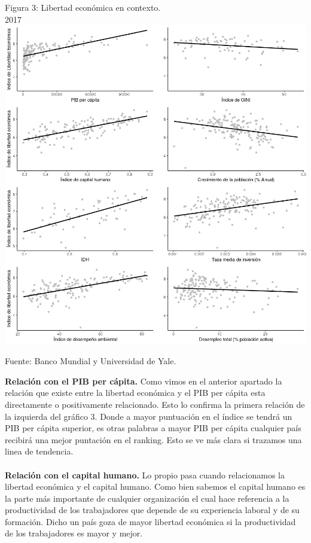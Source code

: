     \begin{center}
	Figura 3: Libertad económica en contexto.\\
	2017\\
	\includegraphics[scale=.65]{codigoFuente/tareas/pensamiento/img/multiplot.png}

	\small{Fuente: Banco Mundial y Universidad de Yale.}
    \end{center}

	\textbf{Relación con el PIB per cápita.}
	Como vimos en el anterior apartado la relación que existe entre la libertad económica y el PIB per cápita esta directamente o positivamente relacionado. Esto lo confirma la primera relación de la izquierda del gráfico 3. Donde a mayor puntuación en el índice se tendrá un PIB per cápita superior, es otras palabras a mayor PIB per cápita cualquier país recibirá una mejor puntación en el ranking. Esto se ve más clara si trazamos una linea de tendencia.\\\\

	\textbf{Relación con el capital humano.}
	Lo propio pasa cuando relacionamos la libertad económica y el capital humano. Como bien sabemos el capital humano es la parte más importante de cualquier organización el cual hace referencia a la productividad de los trabajadores que depende de su experiencia laboral y de su formación. Dicho un país goza de mayor libertad económica si la productividad de los trabajadores es mayor y mejor.\\\\

